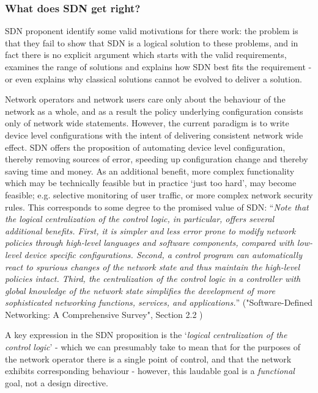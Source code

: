 \subsubsection{What does SDN get right?}

SDN proponent identify some valid motivations for there work: the problem is that they fail to show that SDN is a logical solution to these problems, and in fact there is no explicit argument which starts with the valid requirements, examines the range of solutions and explains how SDN best fits the requirement - or even explains why classical solutions cannot be evolved to deliver a solution.

Network operators and network users care only about the behaviour of the network as a whole, and as a result the policy underlying configuration consists only of network wide statements.
However, the current paradigm is to write device level configurations with the intent of delivering consistent network wide effect.
SDN offers the proposition of automating device level configuration, thereby removing sources of error, speeding up configuration change and thereby saving time and money.
As an additional benefit, more complex functionality which may be technically feasible but in practice ‘just too hard’, may become feasible; e.g. selective monitoring of user traffic, or more complex network security rules.
This corresponds to some degree to the promised value of SDN: “\textit{Note that the logical centralization of the control logic, in particular, offers several additional benefits. First, it is simpler and less error prone to modify network policies through high-level languages and software components, compared with low-level device specific configurations.
Second, a control program can automatically react to spurious changes of the network state and thus maintain the high-level policies intact. Third, the centralization of the control logic in a controller with global knowledge of the network state simplifies the development of more sophisticated networking functions, services, and applications.}”  ("Software-Defined Networking: A Comprehensive Survey", Section 2.2 \cite{Kreutz2015})

A key expression in the SDN proposition is the ‘\textit{logical centralization of the control logic}’ - which we can presumably take to mean that for the purposes of the network operator there is a single point of control, and that the network exhibits corresponding behaviour - however, this laudable goal is a \textit{functional} goal, not a design directive.


